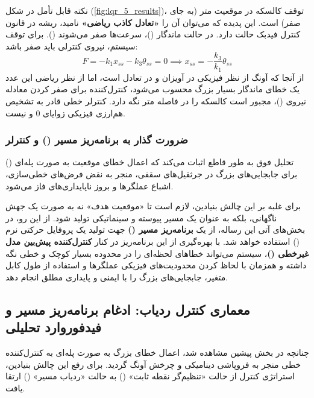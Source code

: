 نکته قابل تأمل در شکل (\ref{fig:lqr_5_results})، توقف کالسکه در موقعیت  متر (به جای صفر) است. این پدیده که می‌توان آن را \textbf{«تعادل کاذب ریاضی»} نامید، ریشه در قانون کنترل فیدبک حالت دارد. در حالت ماندگار ()، سرعت‌ها صفر می‌شوند (). برای توقف سیستم، نیروی کنترلی باید صفر باشد:
\begin{equation}
    F = -k_1 x_{ss} - k_3 \theta_{ss} = 0 \implies x_{ss} = -\frac{k_3}{k_1} \theta_{ss}
\end{equation}
از آنجا که آونگ از نظر فیزیکی در \lr{$\theta = -2\pi$} آویزان و در تعادل است، اما از نظر ریاضی این عدد یک خطای ماندگار بسیار بزرگ محسوب می‌شود، کنترل‌کننده برای صفر کردن معادله نیروی ()، مجبور است کالسکه را در فاصله  متر نگه دارد. کنترلر خطی قادر به تشخیص هم‌ارزی فیزیکی زوایای $0$ و \lr{$-2\pi$} نیست.

\subsubsection{ضرورت گذار به برنامه‌ریز مسیر () و کنترلر }
تحلیل فوق به طور قاطع اثبات می‌کند که اعمال خطای موقعیت به صورت پله‌ای () برای جابجایی‌های بزرگ در جرثقیل‌های سقفی، منجر به نقض فرض‌های خطی‌سازی، اشباع عملگرها و بروز ناپایداری‌های فاز می‌شود.

برای غلبه بر این چالش بنیادین، لازم است تا «موقعیت هدف» نه به صورت یک جهش ناگهانی، بلکه به عنوان یک مسیر پیوسته و سینماتیکی تولید شود. از این رو، در بخش‌های آتی این رساله، از یک \textbf{برنامه‌ریز مسیر ()} جهت تولید یک پروفایل حرکتی نرم () استفاده خواهد شد. با بهره‌گیری از این برنامه‌ریز در کنار \textbf{کنترل‌کننده پیش‌بین مدل غیرخطی ()}، سیستم می‌تواند خطاهای لحظه‌ای را در محدوده بسیار کوچک و خطی نگه داشته و همزمان با لحاظ کردن محدودیت‌های فیزیکی عملگرها و استفاده از طول کابل متغیر، جابجایی‌های بزرگ را با ایمنی و پایداری مطلق انجام دهد.

\subsection{معماری کنترل ردیاب: ادغام برنامه‌ریز مسیر و فیدفوروارد تحلیلی}

چنانچه در بخش پیشین مشاهده شد، اعمال خطای بزرگ به صورت پله‌ای به کنترل‌کننده خطی  منجر به فروپاشی دینامیکی و چرخش آونگ گردید. برای رفع این چالش بنیادین، استراتژی کنترل از حالت «تنظیم‌گر نقطه ثابت» () به حالت «ردیاب مسیر» () ارتقا یافت.

